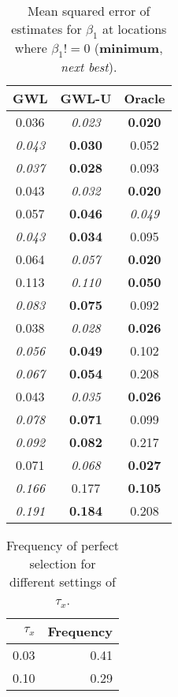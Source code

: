 \documentclass[authoryear, review, 11pt]{elsarticle}
\begin{document}
\begin{table}[ht]
\begin{center}
\begin{tabular}{ccc}
 GWL & GWL-U & Oracle \\ 
  \hline
0.036 & \emph{0.023} & \textbf{0.020} \\ 
  \emph{0.043} & \textbf{0.030} & 0.052 \\ 
  \emph{0.037} & \textbf{0.028} & 0.093 \\ 
  0.043 & \emph{0.032} & \textbf{0.020} \\ 
  0.057 & \textbf{0.046} & \emph{0.049} \\ 
  \emph{0.043} & \textbf{0.034} & 0.095 \\ 
  0.064 & \emph{0.057} & \textbf{0.020} \\ 
  0.113 & \emph{0.110} & \textbf{0.050} \\ 
  \emph{0.083} & \textbf{0.075} & 0.092 \\ 
  0.038 & \emph{0.028} & \textbf{0.026} \\ 
  \emph{0.056} & \textbf{0.049} & 0.102 \\ 
  \emph{0.067} & \textbf{0.054} & 0.208 \\ 
  0.043 & \emph{0.035} & \textbf{0.026} \\ 
  \emph{0.078} & \textbf{0.071} & 0.099 \\ 
  \emph{0.092} & \textbf{0.082} & 0.217 \\ 
  0.071 & \emph{0.068} & \textbf{0.027} \\ 
  \emph{0.166} & 0.177 & \textbf{0.105} \\ 
  \emph{0.191} & \textbf{0.184} & 0.208 \\ 
  \end{tabular}
\caption{Mean squared error of estimates for $\beta_1$ at locations where $\beta_1 != 0$ (\textbf{minimum}, \emph{next best}).\label{MSEX-nonzero}}
\end{center}
\end{table}


\begin{table}[ht]
\begin{center}
\begin{tabular}{rr}
 $\tau_x$ & Frequency \\ 
  \hline
0.03 & 0.41 \\ 
  0.10 & 0.29 \\ 
  \end{tabular}
\caption{Frequency of perfect selection for different settings of $\tau_x$.}
\end{center}
\end{table}
\end{document}
